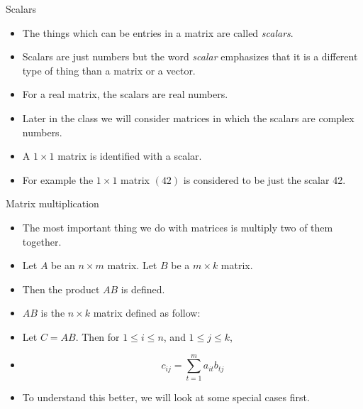 \documentclass{beamer}
\begin{document}


\begin{frame}{Scalars}

\begin{itemize}
\item The things which can be entries in a matrix are called \emph{scalars}.
\item Scalars are just numbers but the word \emph{scalar} emphasizes that it
is a different type of thing than a matrix or a vector.
\item For a real matrix, the scalars are real numbers.
\item Later in the class we will consider matrices in which the scalars
are complex numbers.
\item A $1\times 1$ matrix is identified with a scalar.
\item For example the $1\times 1$ matrix $(42)$ is considered to
be just the scalar 42.
\end{itemize}

\end{frame}


\begin{frame}{Matrix multiplication}

\begin{itemize}
\item The most important thing we do with matrices is multiply two of
them together.
\item Let $A$ be an $n\times m$ matrix. Let $B$ be a $m\times k$ matrix.
\item Then the product $A B$ is defined.
\item $A B$ is the $n\times k$ matrix defined as follow:
\item Let $C=A B$. Then for $1\leq i \leq n$, and $1\leq j \leq k$,
\item $$c_{ij} = \sum_{t=1}^m a_{it} b_{tj}$$
\item To understand this better, we will look at some special cases first.
\end{itemize}

\end{frame}

\end{document}
